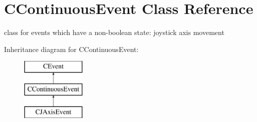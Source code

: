 \hypertarget{classCContinuousEvent}{\section{C\-Continuous\-Event Class Reference}
\label{classCContinuousEvent}
}


class for events which have a non-\/boolean state\-: joystick axis movement  


Inheritance diagram for C\-Continuous\-Event\-:\begin{figure}[H]
\begin{center}
\leavevmode
\includegraphics[height=3.000000cm]{classCContinuousEvent}
\end{center}
\end{figure}
